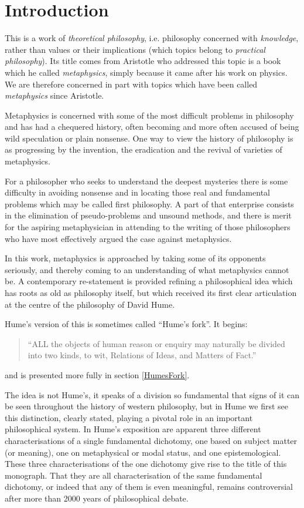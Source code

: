\section{Introduction}\label{Introduction}

This is a work of {\it theoretical philosophy}, i.e. philosophy concerned with {\it knowledge}, rather than values or their implications (which topics belong to {\it practical philosophy}).
Its title comes from Aristotle who addressed this topic is a book which he called {\it metaphysics}, simply because it came after his work on physics.
We are therefore concerned in part with topics which have been called {\it metaphysics} since Aristotle.

Metaphysics is concerned with some of the most difficult problems in philosophy and has had a chequered history, often becoming and more often accused of being wild speculation or plain nonsense.
One way to view the history of philosophy is as progressing by the invention, the eradication and the revival of varieties of metaphysics.  

For a philosopher who seeks to understand the deepest mysteries there is some difficulty in avoiding nonsense and in locating those real and fundamental problems which may be called first philosophy.
A part of that enterprise consists in the elimination of pseudo-problems and unsound methods, and there is merit for the aspiring metaphysician in attending to the writing of those philosophers who have most effectively argued the case against metaphysics.

In this work, metaphysics is approached by taking some of its opponents seriously, and thereby coming to an understanding of what metaphysics cannot be.
A contemporary re-statement is provided refining a philosophical idea which has roots as old as philosophy itself, but which received its first clear articulation at the centre of the philosophy of David Hume.

Hume's version of this is sometimes called ``Hume's fork''.
It begins:

\begin{quote}
``ALL the objects of human reason or enquiry may naturally be divided into two kinds, to wit, Relations of Ideas, and Matters of Fact.''
\end{quote}

and is presented more fully in section \ref{HumesFork}.

The idea is not Hume's, it speaks of a division so fundamental that signs of it can be seen throughout the history of western philosophy, but in Hume we first see this distinction, clearly stated, playing a pivotal role in an important philosophical system.
In Hume's exposition are apparent three different characterisations of a single fundamental dichotomy, one based on subject matter (or meaning), one on metaphysical or modal status, and one epistemological.
These three characterisations of the one dichotomy give rise to the title of this monograph.
That they are all characterisation of the same fundamental dichotomy, or indeed that any of them is even meaningful, remains controversial after more than 2000 years of philosophical debate. 


